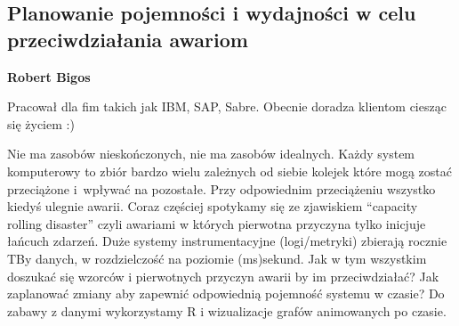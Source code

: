 \documentclass[\main/boa.tex]{subfiles}
\begin{document}
\subsection{Planowanie pojemności i wydajności w celu przeciwdziałania awariom}

\begin{minipage}{0.915\textwidth}
	\centering
  {\bf {} Robert Bigos}
\end{minipage}


\begin{affiliations}
\begin{minipage}{0.915\textwidth}
\centering
Pracował dla fim takich jak IBM, SAP, Sabre. Obecnie doradza klientom ciesząc się życiem :)  \\[-2pt]
\end{minipage}
\end{affiliations}

\vskip 0.3cm

 Nie ma zasobów nieskończonych, nie ma zasobów idealnych. Każdy system komputerowy to zbiór bardzo wielu zależnych od siebie kolejek które mogą zostać przeciążone i~wpływać na pozostałe. Przy odpowiednim przeciążeniu wszystko kiedyś ulegnie awarii. Coraz częściej spotykamy się ze zjawiskiem “capacity rolling disaster” czyli awariami w których pierwotna przyczyna tylko inicjuje łańcuch zdarzeń. Duże systemy instrumentacyjne (logi/metryki) zbierają rocznie TBy danych, w rozdzielczość na poziomie (ms)sekund. Jak w tym wszystkim doszukać się wzorców i pierwotnych przyczyn awarii by im przeciwdziałać? Jak zaplanować zmiany aby zapewnić odpowiednią pojemność systemu w czasie? Do zabawy z danymi wykorzystamy R i wizualizacje grafów animowanych po czasie.
 
\end{document}
